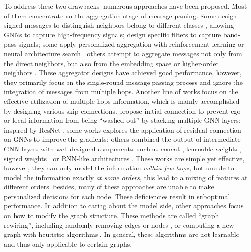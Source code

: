 \documentclass{article}
\begin{document}
To address these two drawbacks, numerous approaches have been proposed. Most of them concentrate on the aggregation stage of message passing. Some design signed messages to distinguish neighbors belong to different classes \citep{yang2021diverse,bo2021beyond,luan2021heterophily,yan2021two}, allowing GNNs to capture high-frequency signals; \citet{min2020scattering} design specific filters to capture band-pass signals; some apply personalized aggregation with reinforcement learning \citep{lai2020policy} or neural architecture search \citep{wang2022graph}; others attempt to aggregate messages not only from the direct neighbors, but also from the embedding space \citep{pei2020geom} or higher-order neighbors \citep{zhu2020beyond}. These aggregator designs have achieved good performance, however, they primarily focus on the single-round message passing process and ignore the integration of messages from multiple hops. Another line of works focus on the effective utilization of multiple hops information, which is mainly accomplished by designing various skip-connections. \citet{klicpera2018predict,chen2020simple} propose initial connection to prevent ego or local information from being ``washed out'' by stacking multiple GNN layers; inspired by ResNet \citep{he2016deep}, some works \citep{li2019deepgcns,chen2020simple,cong2021provable} explores the application of residual connection on GNNs to improve the gradients; others combined the output of intermediate GNN layers with well-designed components, such as concat \citep{xu2018representation,zhu2020beyond}, learnable weights \citep{zhu2020beyond,abu2019mixhop,liu2020towards}, signed weights \citep{chien2020adaptive}, or RNN-like architectures \citep{xu2018representation,sun2019adagcn}. These works are simple yet effective, however, they can only model the information \textit{within few hops}, but unable to model the information exactly \textit{at some orders}, this lead to a mixing of features at different orders;
besides, many of these approaches \citep{li2019deepgcns,abu2019mixhop,chen2020simple,zhu2020beyond,chien2020adaptive,cong2021provable} are unable to make personalized decisions for each node. These deficiencies result in suboptimal performance. In addition to caring about the model side, other approaches focus on how to modify the graph structure. These methods are called ``graph rewiring'', including randomly removing edges \citep{rong2019dropedge} or nodes \citep{feng2020graph}, or computing a new graph with heuristic algorithms \citep{suresh2021breaking,zeng2021decoupling}. In general, these algorithms are not learnable and thus only applicable to certain graphs.
\end{document}
